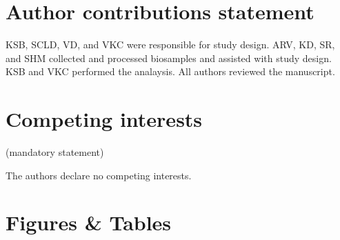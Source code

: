 \documentclass[fleqn,10pt]{wlscirep}
\begin{document}
\section*{Author contributions statement}


KSB, SCLD, VD, and VKC were responsible for study design.
ARV, KD, SR, and SHM collected and processed biosamples and assisted with study design.
KSB and VKC performed the analaysis.
All authors reviewed the manuscript.

\section*{Competing interests} (mandatory statement)

The authors declare no competing interests.

\section*{Figures \& Tables}







\end{document}
